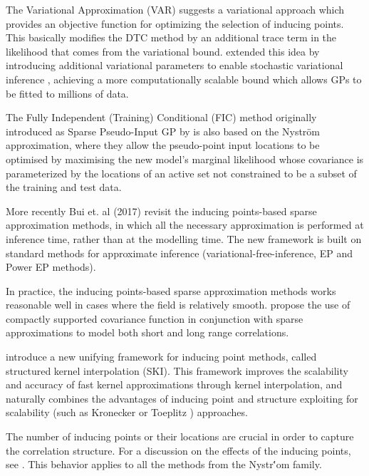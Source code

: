 \documentclass[]{interact}
\theoremstyle{plain}%
\theoremstyle{definition}
\theoremstyle{remark}
\begin{document}
The Variational Approximation (VAR) \citep{titsias2009variational} suggests a variational approach which provides an objective function for optimizing the selection of inducing points. This basically modifies the DTC method by an additional trace term in the likelihood that comes from the variational bound.  \cite{hensman2013gaussian} extended this idea by introducing additional variational parameters to enable stochastic variational inference \citep{hoffman2013stochastic}, achieving a more computationally scalable bound which allows GPs to be fitted to millions of data.

The Fully Independent (Training) Conditional (FIC) \citep{quinonero2005unifying} method originally introduced as Sparse Pseudo-Input GP by \cite{snelson2006sparse} is also based on the Nystr\"om approximation, where they allow the pseudo-point input locations to be optimised by maximising the new model's marginal likelihood whose covariance is parameterized by the locations of an active set not constrained to be a subset of the training and test data.

More recently Bui et. al (2017) revisit the inducing points-based sparse approximation methods, in which all the necessary approximation is performed at inference time, rather than at the modelling time. The new framework is built on standard methods for approximate inference (variational-free-inference, EP and Power EP methods). 

In practice, the inducing points-based sparse approximation methods works reasonable well in cases where the field is relatively smooth. \cite{vanhatalo2010approximate}
propose the use of compactly supported covariance function in conjunction with sparse approximations to model both short and long range correlations.

\cite{wilson2015kernel} introduce a new unifying framework for inducing point methods, called structured kernel interpolation (SKI). This framework improves the scalability and accuracy of fast kernel approximations through kernel interpolation, and naturally combines the advantages of inducing point and structure exploiting for scalability (such as Kronecker \citep{saatcci2012scalable} or Toeplitz \citep{cunningham2008fast}) approaches.

The number of inducing points or their locations are crucial in order to capture the correlation structure. For a discussion on the effects of the inducing points, see \cite{vanhatalo2010approximate}. This behavior applies to all the methods from the Nystr\''om family.
\end{document}
